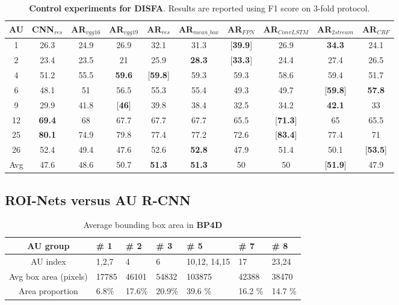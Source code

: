 \documentclass[5p,twocolumn]{elsarticle}
\begin{document}
\begin{table*}
	\scriptsize
	\centering
	
	\setlength{\abovecaptionskip}{0pt} 
	
	\caption{\textbf{Control experiments for DISFA}. Results are reported using F1 score on 3-fold protocol.}
	\label{tab:DISFA_control_expr}

	
	\centering
	\tabcolsep=0.05cm
	\begin{tabular}{c*{9}{c}}
		
		\toprule
		AU & CNN$_{res}$ & AR$_{vgg16}$ & AR$_{vgg19}$ & AR$_{res}$ & AR$_{mean\_box}$ & AR$_{FPN}$ & AR$_{ConvLSTM}$ & AR$_{2stream}$ & AR$_{CRF}$ \\
		\midrule
		1 & 26.3 & 24.9 & 26.9 & 32.1 & 31.3 & [\textbf{39.9}] & 26.9 & \textbf{34.3} & 24.1  \\
		2 & 23.4 & 23.5 & 21 & 25.9 & \textbf{28.3} & [\textbf{33.3}] & 24.4 & 27.4 & 26.5  \\
		4 & 51.2 & 55.5 & \textbf{59.6} & [\textbf{59.8}] & 59.3 & 59.3 & 58.6 & 59.4 & 51.7 \\
		6 & 48.1 & 51 & 56.5 & 55.3 & 55.4 & 49.3 & 49.7 & [\textbf{59.8}] & \textbf{57.8} \\
		9 & 29.9 & 41.8 & [\textbf{46}] & 39.8 & 38.4 & 32.5 & 34.2 & \textbf{42.1} & 33 \\
		12 & \textbf{69.4} & 68 & 67.7 & 67.7 & 67.7 & 65.5 & [\textbf{71.3}] & 65 & 65.5\\
		25 & \textbf{80.1} & 74.9 & 79.8 & 77.4 & 77.2 & 72.6 & [\textbf{83.4}] & 77.4 & 71 \\
		26 & 52.4 & 49.4 & 47.6 & 52.6 & \textbf{52.8} & 47.9 & 51.4 & 50.1 & [\textbf{53.5}] \\
		\midrule
		Avg & 47.6 & 48.6 & 50.7 & \textbf{51.3} & \textbf{51.3} & 50 & 50 & [\textbf{51.9}] & 47.9 \\
		\bottomrule
	\end{tabular}
	\vspace{0.0cm}
\end{table*}


\subsection{ROI-Nets versus AU R-CNN}


\begin{table}[htp]
	\scriptsize	
	\setlength{\abovecaptionskip}{0pt}
	\setlength{\abovecaptionskip}{0pt}
	\caption{Average bounding box area in \textbf{BP4D}}
	\label{tab:BP4D_AREA}
	\centering
	\tabcolsep=0.15cm
	\begin{tabular}{c*{6}{p{6.7ex}}}
		\toprule
		AU group & \# 1 & \# 2 & \# 3 & \# 5 & \# 7 & \# 8\\
		\midrule
		AU index & 1,2,7 & 4 & 6 & 10,12, 14,15 & 17 & 23,24 \\
		\midrule
		Avg box area (pixels) & 17785 & 46101 & 54832 & 103875 & 42388 & 38470 \\
		Area proportion & 6.8\% & 17.6\% & 20.9\% & 39.6 \% & 16.2 \% & 14.7 \% \\
		\bottomrule
	\end{tabular}
	\vspace{1cm}
\end{table}
\end{document}
